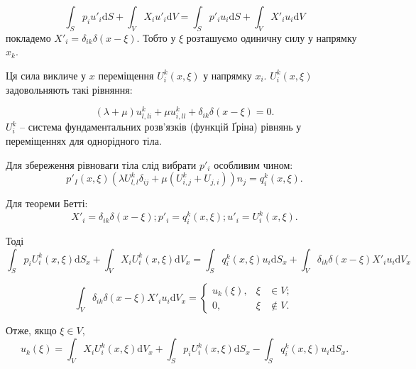 \documentclass[14pt,twoside]{extreport}
\theoremstyle{mystyle}
\numberwithin{equation}{chapter}
\begin{document}
\begin{equation}
\displaystyle\int_{S} p_{i} u'_{i} \mathrm{d}S + \int_{V} X_{i}u'_{i} \mathrm{d}V= \displaystyle\int_{S} p'_{i} u_{i} \mathrm{d}S + \displaystyle\int_{V} X'_{i}u_{i} \mathrm{d}V
\end{equation}
покладемо $X'_{i} = \delta_{ik}\delta(x-\xi)$. Тобто у $\xi$ розташуємо одиничну силу у напрямку $x_k$.

Ця сила викличе у $x$ переміщення $U_{i}^{k} (x,\xi)$ у напрямку $x_i$. $U_{i}^{k}(x, \xi)$ задовольняють такі рівняння:

\begin{equation}
(\lambda + \mu) u_{l,li}^{k} + \mu u_{i,ll}^{k} + \delta_{ik}\delta(x-\xi) = 0.
\end{equation}
$U_i^k$ -- система фундаментальних розв'язків (функцій Ґріна) рівнянь у переміщеннях для однорідного тіла.

Для збереження рівноваги тіла слід вибрати $p'_{i}$ особливим чином:
\begin{equation}
p'_I(x, \xi) \left(\lambda U_{l,l}^k \delta_{ij} + \mu (U_{i,j}^k + U_{j,i})\right)n_j = q_i^k (x, \xi).
\end{equation}

Для теореми Бетті:
\begin{equation}
X'_i = \delta_{ik} \delta(x-\xi); p'_i = q_i^k(x, \xi); u'_i = U_i^k(x, \xi).
\end{equation}

Тоді
\begin{equation}
\displaystyle\int_{S} p_{i} U_i^k (x, \xi)\mathrm{d}S_x + \int_{V} X_{i}U_i^k (x, \xi) \mathrm{d}V_x= \displaystyle\int_{S} q_i^k (x, \xi) u_{i} \mathrm{d}S_x + \displaystyle\int_{V} \delta_{ik} \delta(x-\xi) X'_{i}u_{i} \mathrm{d}V_x
\end{equation}

\begin{equation}
\displaystyle\int_{V} \delta_{ik} \delta(x-\xi) X'_{i}u_{i} \mathrm{d}V_x=\left\{
\begin{array}{lll}
u_k(\xi), &\xi& \in V;\\
0, &\xi& \notin V.
\end{array}
\right.
\end{equation}

Отже, якщо $\xi \in V$,
\begin{equation}\label{som1}
u_k(\xi) = \int_{V} X_{i}U_i^k (x, \xi) \mathrm{d}V_x + \displaystyle\int_{S} p_{i} U_i^k (x, \xi)\mathrm{d}S_x - \displaystyle\int_{S} q_i^k (x, \xi) u_{i} \mathrm{d}S_x.
\end{equation}
\end{document}

